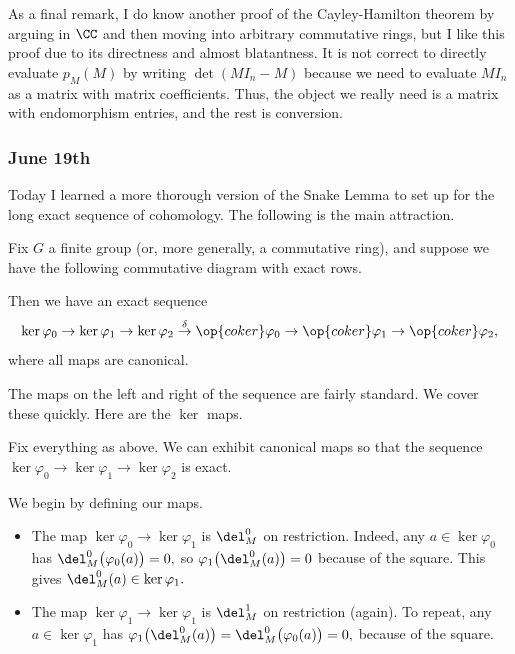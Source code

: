 As a final remark, I do know another proof of the Cayley-Hamilton theorem by arguing in $\CC$ and then moving into arbitrary commutative rings, but I like this proof due to its directness and almost blatantness. It is not correct to directly evaluate $p_M(M)$ by writing $\det(MI_n-M)$ because we need to evaluate $MI_n$ as a matrix with matrix coefficients. Thus, the object we really need is a matrix with endomorphism entries, and the rest is conversion.

\subsubsection{June 19th}
Today I learned a more thorough version of the Snake Lemma to set up for the long exact sequence of cohomology. The following is the main attraction.
\begin{theorem}
    Fix $G$ a finite group (or, more generally, a commutative ring), and suppose we have the following commutative diagram with exact rows.
    \begin{center}
    \end{center}
    Then we have an exact sequence
    \[\ker\varphi_0\to\ker\varphi_1\to\ker\varphi_2\stackrel\delta\to\op{coker}\varphi_0\to\op{coker}\varphi_1\to\op{coker}\varphi_2,\]
    where all maps are canonical.
\end{theorem}
The maps on the left and right of the sequence are fairly standard. We cover these quickly. Here are the $\ker$ maps.
\begin{lemma}
    Fix everything as above. We can exhibit canonical maps so that the sequence $\ker\varphi_0\to\ker\varphi_1\to\ker\varphi_2$ is exact.
\end{lemma}
We begin by defining our maps.
\begin{itemize}
    \item The map $\ker\varphi_0\to\ker\varphi_1$ is $\del_M^0$ on restriction. Indeed, any $a\in\ker\varphi_0$ has $\del_M^0\big(\varphi_0(a)\big)=0,$ so $\varphi_1\big(\del_M^0(a)\big)=0$ because of the square. This gives $\del_M^0(a)\in\ker\varphi_1.$
    \item The map $\ker\varphi_1\to\ker\varphi_1$ is $\del_M^1$ on restriction (again). To repeat, any $a\in\ker\varphi_1$ has $\varphi_1\big(\del_M^0(a)\big)=\del_M^0\big(\varphi_0(a)\big)=0,$ because of the square.
\end{itemize}
